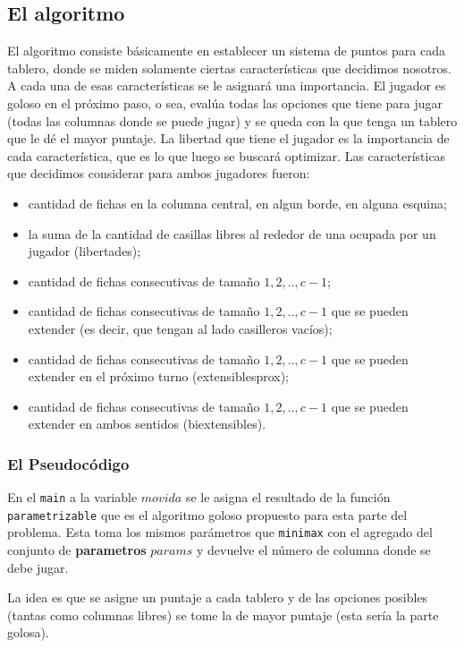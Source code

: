 \documentclass[A4paper,oneside,fleqn,11pt]{article}
\theoremstyle{definition}
\begin{document}
\subsection{El algoritmo}
El algoritmo consiste básicamente en establecer un sistema de puntos para cada tablero, donde se miden solamente ciertas características que decidimos nosotros. A cada una de esas características se le asignará una importancia. El jugador es goloso en el próximo paso, o sea, evalúa todas las opciones que tiene para jugar (todas las columnas donde se puede jugar) y se queda con la que tenga un tablero que le dé el mayor puntaje. La libertad que tiene el jugador es la importancia de cada característica, que es lo que luego se buscará optimizar. Las características que decidimos considerar para ambos jugadores fueron:

\begin{itemize}
\item cantidad de fichas en la columna central, en algun borde, en alguna esquina;
\item la suma de la cantidad de casillas libres al rededor de una ocupada por un jugador (libertades);
\item cantidad de fichas consecutivas de tamaño $1,2,..,c-1$;
\item cantidad de fichas consecutivas de tamaño $1,2,..,c-1$ que se pueden extender (es decir, que tengan al lado casilleros vacíos); 
\item cantidad de fichas consecutivas de tamaño $1,2,..,c-1$ que se pueden extender en el próximo turno (extensiblesprox);
\item cantidad de fichas consecutivas de tamaño $1,2,..,c-1$ que se pueden extender en ambos sentidos (biextensibles).
\end{itemize}
\subsubsection{El Pseudocódigo}
En el \texttt{main} a la variable $movida$ se le asigna el resultado de la función \texttt{parametrizable} que es el algoritmo goloso propuesto para esta parte del problema. Esta toma los mismos parámetros que \texttt{minimax} con el agregado del conjunto de \textbf{parametros} $params$ y devuelve el número de columna donde se debe jugar.

La idea es que se asigne un puntaje a cada tablero y de las opciones posibles (tantas como columnas libres) se tome la de mayor puntaje (esta sería la parte golosa).
\end{document}
